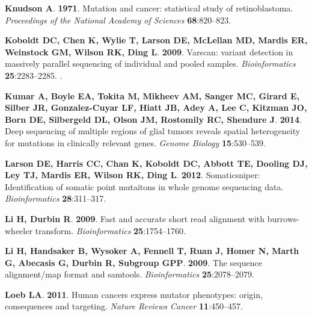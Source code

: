 \documentclass[11 pt]{article} %
\begin{document}
\begin{thebibliography}{31}
\textbf{Knudson A}. \textbf{1971}.
\newblock Mutation and cancer: statistical study of retinoblastoma.
\newblock \emph{Proceedings of the National Academy of Sciences}
  \textbf{68}:820--823.

\textbf{Koboldt DC, Chen K, Wylie T, Larson DE, McLellan MD, Mardis ER,
  Weinstock GM, Wilson RK, Ding L}. \textbf{2009}.
\newblock Varscan: variant detection in massively parallel sequencing of
  individual and pooled samples.
\newblock \emph{Bioinformatics} \textbf{25}:2283--2285.
\newblock {}.

\textbf{Kumar A, Boyle EA, Tokita M, Mikheev AM, Sanger MC, Girard E, Silber
  JR, Gonzalez-Cuyar LF, Hiatt JB, Adey A, Lee C, Kitzman JO, Born DE,
  Silbergeld DL, Olson JM, Rostomily RC, Shendure J}. \textbf{2014}.
\newblock Deep sequencing of multiple regions of glial tumors reveals spatial
  heterogeneity for mutations in clinically relevant genes.
\newblock \emph{Genome Biology} \textbf{15}:530--539.

\textbf{Larson DE, Harris CC, Chan K, Koboldt DC, Abbott TE, Dooling DJ, Ley
  TJ, Mardis ER, Wilson RK, Ding L}. \textbf{2012}.
\newblock Somaticsniper: Identification of somatic point mutaitons in whole
  genome sequencing data.
\newblock \emph{Bioinformatics} \textbf{28}:311--317.

\textbf{Li H, Durbin R}. \textbf{2009}.
\newblock Fast and accurate short read alignment with burrows-wheeler
  transform.
\newblock \emph{Bioinformatics} \textbf{25}:1754--1760.

\textbf{Li H, Handsaker B, Wysoker A, Fennell T, Ruan J, Homer N, Marth G,
  Abecasis G, Durbin R, Subgroup GPP}. \textbf{2009}.
\newblock The sequence alignment/map format and samtools.
\newblock \emph{Bioinformatics} \textbf{25}:2078--2079.

\textbf{Loeb LA}. \textbf{2011}.
\newblock Human cancers express mutator phenotypes: origin, consequences and
  targeting.
\newblock \emph{Nature Reviews Cancer} \textbf{11}:450--457.


\end{thebibliography}
\end{document}
